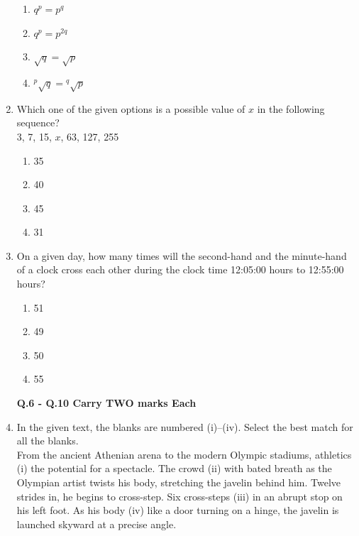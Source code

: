 \documentclass[journal,12pt,onecolumn]{exam}
\theoremstyle{remark}
\begin{document}
\begin{enumerate}
    \begin{enumerate}[label=\alph*)]
        \item $q^p = p^q$
        \item $q^p = p^{2q}$
        \item $\sqrt{q} = \sqrt{p}$
        \item ${}^p\sqrt{q} = {}^q\sqrt{p}$
    \end{enumerate}

\newpage

 \item Which one of the given options is a possible value of $x$ in the following sequence? \\
    3, 7, 15, $x$, 63, 127, 255
    
    \begin{enumerate}[label=\alph*)]
        \item 35
        \item 40
        \item 45
        \item 31
    \end{enumerate}

    \item On a given day, how many times will the second-hand and the minute-hand of a clock cross each other during the clock time 12:05:00 hours to 12:55:00 hours?
    
    \begin{enumerate}[label=\alph*)]
        \item 51
        \item 49
        \item 50
        \item 55
    \end{enumerate}
    
\vspace{1em}

\textbf{Q.6 - Q.10 Carry TWO marks Each}

\item In the given text, the blanks are numbered (i)--(iv). Select the best match for all the blanks. \\
    From the ancient Athenian arena to the modern Olympic stadiums, athletics \underline{\hspace{1cm}} (i) the potential for a spectacle. The crowd \underline{\hspace{1cm}} (ii) with bated breath as the Olympian artist twists his body, stretching the javelin behind him. Twelve strides in, he begins to cross-step. Six cross-steps \underline{\hspace{1cm}} (iii) in an abrupt stop on his left foot. As his body \underline{\hspace{1cm}} (iv) like a door turning on a hinge, the javelin is launched skyward at a precise angle.


\end{enumerate}
\end{document}
